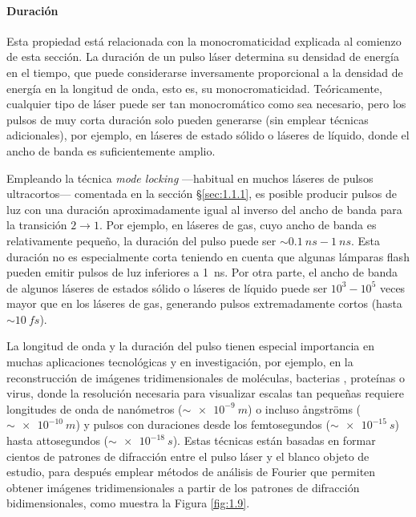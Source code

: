 \paragraph{Duración}
Esta propiedad está relacionada con la monocromaticidad explicada al comienzo de esta sección. La duración de un pulso láser determina su densidad de energía en el tiempo, que puede considerarse inversamente proporcional a la densidad de energía en la longitud de onda, esto es, su monocromaticidad\autocite{Svelto2010}. Teóricamente, cualquier tipo de láser puede ser tan monocromático como sea necesario, pero los pulsos de muy corta duración solo pueden generarse (sin emplear técnicas adicionales), por ejemplo, en láseres de estado sólido o láseres de líquido, donde el ancho de banda es suficientemente amplio.

Empleando la técnica \emph{mode locking} ---habitual en muchos láseres de pulsos ultracortos--- comentada en la sección \S\ref{sec:1.1.1}, es posible producir pulsos de luz con una duración aproximadamente igual al inverso del ancho de banda para la transición $2 \rightarrow 1$. Por ejemplo, en láseres de gas, cuyo ancho de banda es relativamente pequeño, la duración del pulso puede ser $\sim\qty{0,1}{ns}-\qty{1}{ns}$. Esta duración no es especialmente corta teniendo en cuenta que algunas lámparas flash pueden emitir pulsos de luz inferiores a \qty{1}{ns}. Por otra parte, el ancho de banda de algunos láseres de estados sólido o láseres de líquido puede ser $10^3-10^5$ veces mayor que en los láseres de gas, generando pulsos extremadamente cortos (hasta $\sim\qty{10}{fs}$).

La longitud de onda y la duración del pulso tienen especial importancia en muchas aplicaciones tecnológicas y en investigación, por ejemplo, en la reconstrucción de imágenes tridimensionales de moléculas\autocite{vonArdenne2018}, bacterias \autocite{Fan2016}, proteínas \autocite{Neutze2000} o virus\autocite{Ekeberg2015}, donde la resolución necesaria para visualizar escalas tan pequeñas requiere longitudes de onda de nanómetros ($\sim\qty{e-9}{m}$) o incluso ångströms ($\sim\qty{e-10}{m}$) y pulsos con duraciones desde los femtosegundos ($\sim\qty{e-15}{s}$) hasta attosegundos ($\sim\qty{e-18}{s}$). Estas técnicas están basadas en formar cientos de patrones de difracción entre el pulso láser y el blanco objeto de estudio, para después emplear métodos de análisis de Fourier que permiten obtener imágenes tridimensionales a partir de los patrones de difracción bidimensionales, como muestra la Figura \ref{fig:1.9}.

